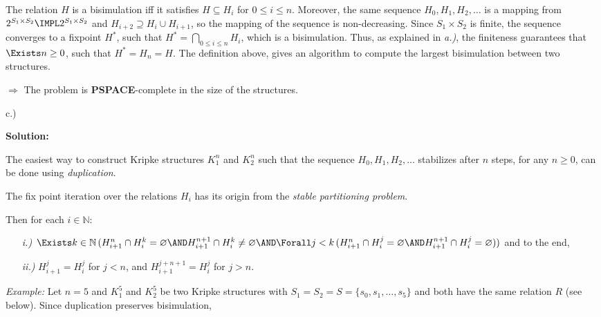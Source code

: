 \bigskip 

The relation $H$ is a bisimulation iff it satisfies $H\subseteq H_{i}$ for $%
0\leq i\leq n$. Moreover, the same sequence $H_{0},H_{1},H_{2},\ldots $ is a
mapping from $2^{S_{1}\times S_{2}}\IMPL 2^{S_{1}\times S_{2}}$ and $%
H_{i+2}\supseteq H_{i}\cup H_{i+1}$, so the mapping of the sequence is
non-decreasing. Since $S_{1}\times S_{2}$ is finite, the sequence converges
to a fixpoint $H^{\ast }$, such that $H^{\ast }=\bigcap\nolimits_{0\leq
i\leq n}H_{i}$, which is a bisimulation. Thus, as explained in \textit{a.)},
the finiteness guarantees that $\Exists n\geq 0$, such that $H^{\ast
}=H_{n}=H$. The definition above, gives an algorithm to compute the largest
bisimulation between two structures.

\bigskip 

$\Rightarrow $ The problem is \textbf{PSPACE}-complete in the size of the
structures.

\bigskip 

c.)

\textbf{Solution:}

\medskip

The easiest way to construct Kripke structures $K_{1}^{n}$ and $K_{2}^{n}$
such that the sequence $H_{0},H_{1},H_{2},\ldots $ stabilizes after $n$
steps, for any $n\geq 0$, can be done using \textit{duplication}.

The fix point iteration over the relations $H_{i}$ has its origin from the \textit{stable
partitioning problem}.\medskip\\

{\small
Then for each $i\in \mathbb{N}$:
\begin{enumerate}
\item[\textit{i.)}] $\Exists k\in \mathbb{N\,(}H_{i+1}^{n}\cap H_{i}^{k}=\varnothing \AND %
H_{i+1}^{n+1}\cap H_{i}^{k}\neq \varnothing \AND\Forall j<k\,(H_{i+1}^{n}%
\cap H_{i}^{j}=\varnothing \AND H_{i+1}^{n+1}\cap H_{i}^{j}=\varnothing ))$
and to the end,

\item[\textit{ii.)}] $H_{i+1}^{j}=H_{i}^{j}$ for $j<n$, and $%
H_{i+1}^{j+n+1}=H_{i}^{j}$ for $j>n.$
\end{enumerate}
}

\bigskip 

\textit{Example:} Let  $n=5$ and $K_{1}^{5}$ and $K_{2}^{5}$ be two Kripke
structures with $S_{1}=S_{2}=S=\{s_{0},s_{1},\ldots ,s_{5}\}$ and both have
the same relation $R$ (see below). Since duplication preserves bisimulation,

